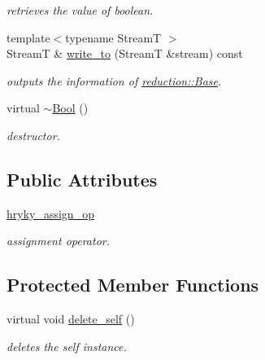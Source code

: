 \begin{DoxyCompactItemize}
\begin{DoxyCompactList}\small\item\em retrieves the value of boolean. \end{DoxyCompactList}\item 
\hypertarget{classhryky_1_1reduction_1_1_base_a709cc7c48e1c90fe253739e46d82aa19}{{\footnotesize template$<$typename Stream\-T $>$ }\\Stream\-T \& \hyperlink{classhryky_1_1reduction_1_1_base_a709cc7c48e1c90fe253739e46d82aa19}{write\-\_\-to} (Stream\-T \&stream) const }\label{classhryky_1_1reduction_1_1_base_a709cc7c48e1c90fe253739e46d82aa19}

\begin{DoxyCompactList}\small\item\em outputs the information of \hyperlink{classhryky_1_1reduction_1_1_base}{reduction\-::\-Base}. \end{DoxyCompactList}\item 
\hypertarget{classhryky_1_1reduction_1_1_bool_af5e676d54857e65d034188674a9c3ae9}{virtual \hyperlink{classhryky_1_1reduction_1_1_bool_af5e676d54857e65d034188674a9c3ae9}{$\sim$\-Bool} ()}\label{classhryky_1_1reduction_1_1_bool_af5e676d54857e65d034188674a9c3ae9}

\begin{DoxyCompactList}\small\item\em destructor. \end{DoxyCompactList}\end{DoxyCompactItemize}
\subsection*{Public Attributes}
\begin{DoxyCompactItemize}
\item 
\hypertarget{classhryky_1_1reduction_1_1_bool_a7d44a7c568c4c6c457c51aa9b8e42fa1}{\hyperlink{classhryky_1_1reduction_1_1_bool_a7d44a7c568c4c6c457c51aa9b8e42fa1}{hryky\-\_\-assign\-\_\-op}}\label{classhryky_1_1reduction_1_1_bool_a7d44a7c568c4c6c457c51aa9b8e42fa1}

\begin{DoxyCompactList}\small\item\em assignment operator. \end{DoxyCompactList}\end{DoxyCompactItemize}
\subsection*{Protected Member Functions}
\begin{DoxyCompactItemize}
\item 
virtual void \hyperlink{classhryky_1_1reduction_1_1_base_a100265b04179500cd7901c8afea64eb0}{delete\-\_\-self} ()
\begin{DoxyCompactList}\small\item\em deletes the self instance. \end{DoxyCompactList}\end{DoxyCompactItemize}


